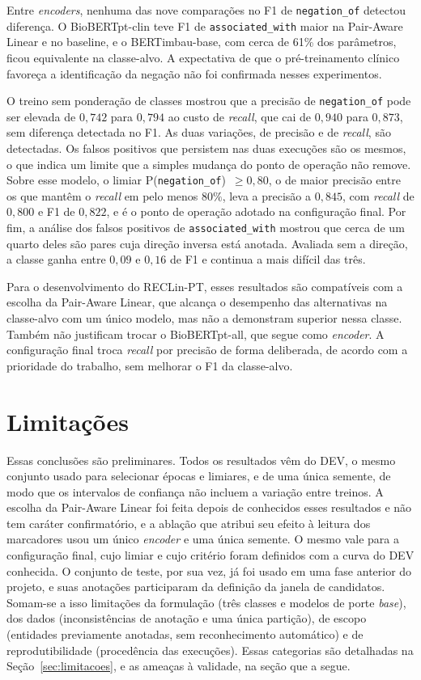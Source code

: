 Entre \emph{encoders}, nenhuma das nove comparações no F1 de \texttt{negation\_of}
detectou diferença. O BioBERTpt-clin teve F1 de \texttt{associated\_with} maior na
Pair-Aware Linear e no baseline, e o BERTimbau-base, com cerca de 61\% dos
parâmetros, ficou equivalente na classe-alvo. A expectativa de que o pré-treinamento
clínico favoreça a identificação da negação não foi confirmada nesses experimentos.

O treino sem ponderação de classes mostrou que a precisão de \texttt{negation\_of}
pode ser elevada de $0{,}742$ para $0{,}794$ ao custo de \emph{recall}, que cai de
$0{,}940$ para $0{,}873$, sem diferença detectada no F1. As duas variações, de
precisão e de \emph{recall}, são detectadas. Os falsos positivos que
persistem nas duas execuções são os mesmos, o que indica um limite que a simples
mudança do ponto de operação não remove. Sobre esse modelo, o limiar
P(\texttt{negation\_of})~$\geq 0{,}80$, o de maior precisão entre os que mantêm o
\emph{recall} em pelo menos $80\%$, leva a precisão a $0{,}845$, com \emph{recall} de
$0{,}800$ e F1 de $0{,}822$, e é o ponto de operação adotado na configuração final. Por fim, a análise dos falsos positivos de
\texttt{associated\_with} mostrou que cerca de um quarto deles são pares cuja
direção inversa está anotada. Avaliada sem a direção, a classe ganha entre $0{,}09$ e
$0{,}16$ de F1 e continua a mais difícil das três.

Para o desenvolvimento do RECLin-PT, esses resultados são compatíveis com a escolha
da Pair-Aware Linear, que alcança o desempenho das alternativas na classe-alvo com
um único modelo, mas não a demonstram superior nessa classe. Também não justificam
trocar o BioBERTpt-all, que segue como \emph{encoder}. A configuração final troca
\emph{recall} por precisão de forma deliberada, de acordo com a prioridade do
trabalho, sem melhorar o F1 da classe-alvo.

\section{Limitações}

Essas conclusões são preliminares. Todos os resultados vêm do DEV, o mesmo conjunto
usado para selecionar épocas e limiares, e de uma única semente, de modo que os
intervalos de confiança não incluem a variação entre treinos. A escolha da
Pair-Aware Linear foi feita depois de conhecidos esses resultados e não tem caráter
confirmatório, e a ablação que atribui seu efeito à leitura dos marcadores usou
um único \emph{encoder} e uma única semente. O mesmo vale para a configuração
final, cujo limiar e cujo critério foram definidos com a curva do DEV conhecida. O conjunto de teste, por sua vez, já foi usado em uma fase anterior
do projeto, e suas anotações participaram da definição da janela de candidatos.
Somam-se a isso limitações da formulação (três classes e modelos de porte
\emph{base}), dos dados (inconsistências de anotação e uma única partição), de
escopo (entidades previamente anotadas, sem reconhecimento automático) e de
reprodutibilidade (procedência das execuções). Essas categorias são detalhadas na
Seção~\ref{sec:limitacoes}, e as ameaças à validade, na seção que a segue.


